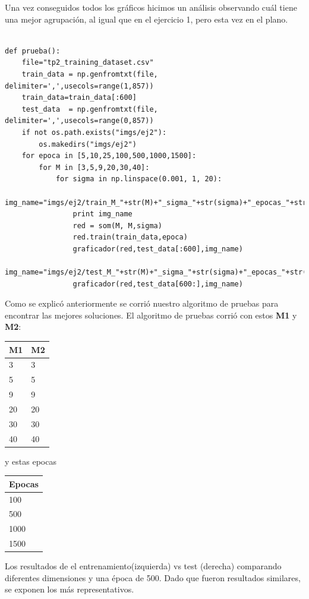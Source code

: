 Una vez conseguidos todos los gr\'aficos hicimos un an\'alisis observando cu\'al tiene una mejor agrupaci\'on, al igual que en el ejercicio 1, pero esta vez en el plano.


\begin{lstlisting}[caption=pruebas]
	
def prueba():
	file="tp2_training_dataset.csv"
	train_data = np.genfromtxt(file, delimiter=',',usecols=range(1,857))
	train_data=train_data[:600]
	test_data  = np.genfromtxt(file, delimiter=',',usecols=range(0,857))
	if not os.path.exists("imgs/ej2"):
		os.makedirs("imgs/ej2")
	for epoca in [5,10,25,100,500,1000,1500]:
		for M in [3,5,9,20,30,40]:
			for sigma in np.linspace(0.001, 1, 20):
				img_name="imgs/ej2/train_M_"+str(M)+"_sigma_"+str(sigma)+"_epocas_"+str(epoca)+".png"
				print img_name
				red = som(M, M,sigma)
				red.train(train_data,epoca)
				graficador(red,test_data[:600],img_name)
				img_name="imgs/ej2/test_M_"+str(M)+"_sigma_"+str(sigma)+"_epocas_"+str(epoca)+".png"
				graficador(red,test_data[600:],img_name)

\end{lstlisting}

Como se explic\'o anteriormente se corri\'o nuestro algoritmo de pruebas para encontrar las mejores soluciones. El algoritmo de pruebas corri\'o con estos \textbf{M1} y \textbf{M2}:

\begin{tabular}{|l|l|}
\hline
M1 & M2 \\ \hline
3 & 3 \\ \hline
5 & 5 \\ \hline
9 & 9 \\ \hline
20 & 20 \\ \hline
30 & 30 \\ \hline
40 & 40 \\ \hline
\end{tabular}

y estas epocas

\begin{tabular}{|l|}
\hline
Epocas\\ \hline
100 \\ \hline
500 \\ \hline
1000 \\ \hline
1500 \\ \hline
\end{tabular}

Los resultados de el entrenamiento(izquierda) vs test (derecha) comparando diferentes dimensiones y una \'epoca de 500. Dado que fueron resultados similares, se exponen los m\'as representativos.

